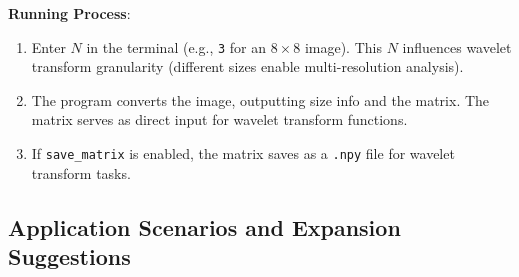 \documentclass{article}
\theoremstyle{definition} %
\begin{document}



\textbf{Running Process}:
\begin{enumerate}
    \item Enter \(N\) in the terminal (e.g., \texttt{3} for an \(8 \times 8\) image). This \(N\) influences wavelet transform granularity (different sizes enable multi-resolution analysis).
    \item The program converts the image, outputting size info and the matrix. The matrix serves as direct input for wavelet transform functions.
    \item If \texttt{save\_matrix} is enabled, the matrix saves as a \texttt{.npy} file for wavelet transform tasks.
\end{enumerate}


\subsection{Application Scenarios and Expansion Suggestions}
\end{document}
